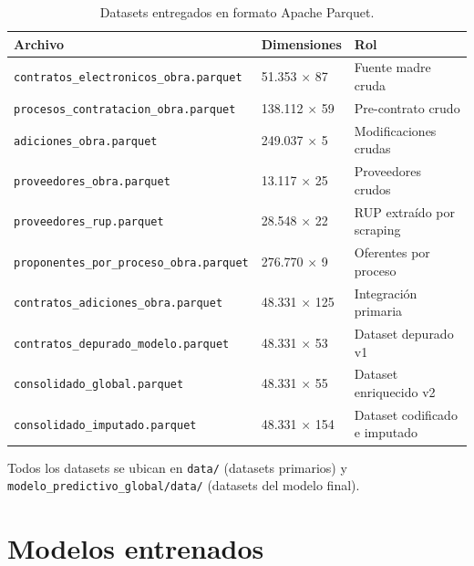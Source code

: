 \documentclass[12pt,letterpaper,oneside]{report}
\begin{document}
\begin{table}[H]
\centering
\caption{Datasets entregados en formato Apache Parquet.}
\label{tab:datasets_entregados}
\small
\begin{tabular}{p{6cm}p{2cm}p{6cm}}
\toprule
\textbf{Archivo} & \textbf{Dimensiones} & \textbf{Rol} \\
\midrule
\texttt{contratos\_electronicos\_obra.parquet} & 51.353 $\times$ 87 & Fuente madre cruda \\
\texttt{procesos\_contratacion\_obra.parquet} & 138.112 $\times$ 59 & Pre-contrato crudo \\
\texttt{adiciones\_obra.parquet} & 249.037 $\times$ 5 & Modificaciones crudas \\
\texttt{proveedores\_obra.parquet} & 13.117 $\times$ 25 & Proveedores crudos \\
\texttt{proveedores\_rup.parquet} & 28.548 $\times$ 22 & RUP extraído por scraping \\
\texttt{proponentes\_por\_proceso\_obra.parquet} & 276.770 $\times$ 9 & Oferentes por proceso \\
\texttt{contratos\_adiciones\_obra.parquet} & 48.331 $\times$ 125 & Integración primaria \\
\texttt{contratos\_depurado\_modelo.parquet} & 48.331 $\times$ 53 & Dataset depurado v1 \\
\texttt{consolidado\_global.parquet} & 48.331 $\times$ 55 & Dataset enriquecido v2 \\
\texttt{consolidado\_imputado.parquet} & 48.331 $\times$ 154 & Dataset codificado e imputado \\
\bottomrule
\end{tabular}
\end{table}

Todos los datasets se ubican en \texttt{data/} (datasets primarios) y
\texttt{modelo\_predictivo\_global/data/} (datasets del modelo final).

\section{Modelos entrenados}
\end{document}
